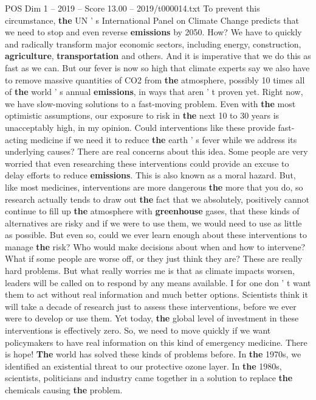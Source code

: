 \begin{textsample}{POS Dim 1 – 2019 – Score 13.00 – 2019/t000014.txt}
To prevent this circumstance, \textbf{the} UN ' s International Panel on Climate Change predicts that we need to stop and even reverse \textbf{emissions} by 2050.
How?
We have to quickly and radically transform major economic sectors, including energy, construction, \textbf{agriculture}, \textbf{transportation} and others.
And it is imperative that we do this as fast as we can.
But our fever is now so high that climate experts say we also have to remove massive quantities of CO2 from \textbf{the} atmosphere, possibly 10 times all of \textbf{the} world ' s annual \textbf{emissions}, in ways that aren ' t proven yet.
Right now, we have slow-moving solutions to a fast-moving problem.
Even with \textbf{the} most optimistic assumptions, our exposure to risk in \textbf{the} next 10 to 30 years is unacceptably high, in my opinion.
Could interventions like these provide fast-acting medicine if we need it to reduce \textbf{the} earth ' s fever while we address its underlying causes?
There are real concerns about this idea.
Some people are very worried that even researching these interventions could provide an excuse to delay efforts to reduce \textbf{emissions}.
This is also known as a moral hazard.
But, like most medicines, interventions are more dangerous \textbf{the} more that you do, so research actually tends to draw out \textbf{the} fact that we absolutely, positively cannot continue to fill up \textbf{the} atmosphere with \textbf{greenhouse} gases, that these kinds of alternatives are risky and if we were to use them, we would need to use as little as possible.
But even so, could we ever learn enough about these interventions to manage \textbf{the} risk?
Who would make decisions about when and how to intervene?
What if some people are worse off, or they just think they are?
These are really hard problems.
But what really worries me is that as climate impacts worsen, leaders will be called on to respond by any means available.
I for one don ' t want them to act without real information and much better options.
Scientists think it will take a decade of research just to assess these interventions, before we ever were to develop or use them.
Yet today, \textbf{the} global level of investment in these interventions is effectively zero.
So, we need to move quickly if we want policymakers to have real information on this kind of emergency medicine.
There is hope! \textbf{The} world has solved these kinds of problems before.
In \textbf{the} 1970s, we identified an existential threat to our protective ozone layer.
In \textbf{the} 1980s, scientists, politicians and industry came together in a solution to replace \textbf{the} chemicals causing \textbf{the} problem.

\end{textsample}
